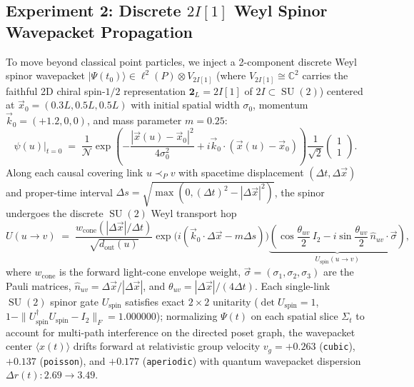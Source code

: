 \documentclass[11pt,a4paper]{article}
\theoremstyle{definition}
\theoremstyle{remark}
\newcommand{\C}{\mathbb{C}}
\newcommand{\SU}{\operatorname{SU}}
\begin{document}
\subsection{Experiment 2: Discrete \texorpdfstring{$2I[1]$}{2I[1]} Weyl Spinor Wavepacket Propagation}

To move beyond classical point particles, we inject a 2-component discrete Weyl spinor wavepacket $|\Psi(t_0)\rangle \in \ell^2(P) \otimes V_{2I[1]}$ (where $V_{2I[1]} \cong \C^2$ carries the faithful 2D chiral spin-$1/2$ representation $\mathbf{2}_L = 2I[1]$ of $2I \subset \SU(2)$) centered at $\vec{x}_0 = (0.3 L, 0.5 L, 0.5 L)$ with initial spatial width $\sigma_0$, momentum $\vec{k}_0 = (+1.2, 0, 0)$, and mass parameter $m = 0.25$:
\begin{equation}
\psi(u)\big|_{t=0} \;=\; \frac{1}{\mathcal{N}} \exp\!\left(-\frac{|\vec{x}(u) - \vec{x}_0|^2}{4\sigma_0^2} + i\vec{k}_0 \cdot (\vec{x}(u) - \vec{x}_0)\right) \frac{1}{\sqrt{2}}\begin{pmatrix} 1 \\ 1 \end{pmatrix}.
\end{equation}
Along each causal covering link $u \prec_P v$ with spacetime displacement $(\Delta t, \Delta \vec{x})$ and proper-time interval $\Delta s = \sqrt{\max(0, (\Delta t)^2 - |\Delta \vec{x}|^2)}$, the spinor undergoes the discrete $\SU(2)$ Weyl transport hop
\begin{equation}
U(u \to v) \;=\; \frac{w_{\mathrm{cone}}(|\Delta \vec{x}| / \Delta t)}{\sqrt{d_{\mathrm{out}}(u)}} \exp\!\bigl(i(\vec{k}_0 \cdot \Delta \vec{x} - m\Delta s)\bigr) \underbrace{\left(\cos\frac{\theta_{uv}}{2}\,I_2 - i\sin\frac{\theta_{uv}}{2}\,\hat{n}_{uv}\cdot\vec{\sigma}\right)}_{U_{\mathrm{spin}}(u \to v)},
\end{equation}
where $w_{\mathrm{cone}}$ is the forward light-cone envelope weight, $\vec{\sigma} = (\sigma_1, \sigma_2, \sigma_3)$ are the Pauli matrices, $\hat{n}_{uv} = \Delta \vec{x}/|\Delta \vec{x}|$, and $\theta_{uv} = |\Delta \vec{x}| / (4\Delta t)$. Each single-link $\SU(2)$ spinor gate $U_{\mathrm{spin}}$ satisfies exact $2\times 2$ unitarity ($\det U_{\mathrm{spin}} = 1$, $1 - \|U_{\mathrm{spin}}^\dagger U_{\mathrm{spin}} - I_2\|_F = 1.000000$); normalizing $\Psi(t)$ on each spatial slice $\Sigma_t$ to account for multi-path interference on the directed poset graph, the wavepacket center $\langle x(t)\rangle$ drifts forward at relativistic group velocity $v_g = +0.263$ (\texttt{cubic}), $+0.137$ (\texttt{poisson}), and $+0.177$ (\texttt{aperiodic}) with quantum wavepacket dispersion $\Delta r(t): 2.69 \to 3.49$.
\end{document}
